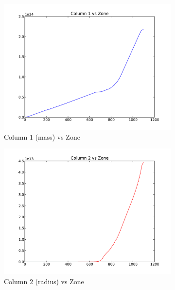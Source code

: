 \documentclass[11pt,letterpaper]{article}
\begin{document}
\begin{figure}[bth]
\centering
\begin{subfigure}{.5\textwidth}
  \centering
  \includegraphics[width=.95\linewidth]{mass_vs_zone.pdf}
  \caption*{Column 1 (mass) vs Zone}
  \label{fig:sub1}
\end{subfigure}%
\begin{subfigure}{.5\textwidth}
  \centering
  \includegraphics[width=.95\linewidth]{radius_vs_zone.pdf}
  \caption*{Column 2 (radius) vs Zone}
  \label{fig:sub2}
\end{subfigure}
\caption{}
\label{fig:cols12}
\end{figure}
\end{document}
